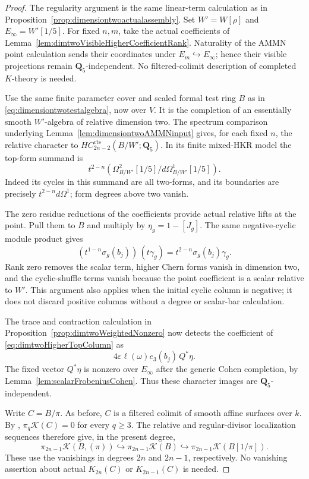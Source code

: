 \documentclass[11pt,a4paper]{article}
\theoremstyle{remark}
\begin{document}
\begin{proof}
The regularity argument is the same linear-term calculation as in
Proposition~\ref{prop:dimensiontwoactualassembly}.
Set $W'=W[\rho]$ and $E_\infty=W'[1/5]$.
For fixed $n,m$, take the actual coefficients of
Lemma~\ref{lem:dimtwoVisibleHigherCoefficientRank}.
Naturality of the AMMN point calculation sends their coordinates
under $E_m\hookrightarrow E_\infty$; hence their visible
projections remain $\mathbf Q_5$-independent.
No filtered-colimit description of completed $K$-theory is needed.

Use the same finite parameter cover and scaled formal test ring
$B$ as in \eqref{eq:dimensiontwotestalgebra}, now over $V$.
It is the completion of an essentially smooth $W'$-algebra
of relative dimension two.  The spectrum comparison underlying
Lemma~\ref{lem:dimensiontwoAMMNinput} gives, for each fixed $n$,
the relative character to $HC_{2n-2}^{\mathrm{cts}}(B/W';\mathbf Q_5)$.
In its finite mixed-HKR model the top-form summand is
\begin{equation}
\label{eq:dimtwoHigherTopColumn}
 t^{2-n}\left(
 \Omega^2_{B/W'}[1/5]/d\Omega^1_{B/W'}[1/5]\right).
\end{equation}
Indeed its cycles in this summand are all two-forms, and its
boundaries are precisely $t^{2-n}d\Omega^1$; form degrees above
two vanish.

The zero residue reductions of the coefficients provide actual
relative lifts at the point.  Pull them to $B$ and multiply by
$\eta_g=1-[J_g]$.  The same negative-cyclic module product gives
\[
 (t^{1-n}\sigma_g(b_j))\,(t\gamma_g)
           =t^{2-n}\sigma_g(b_j)\gamma_g.
\]
Rank zero removes the scalar term, higher Chern forms vanish in
dimension two, and the cyclic-shuffle terms vanish because the
point coefficient is a scalar relative to $W'$.
This argument also applies when the initial cyclic column is
negative; it does not discard positive columns without a degree
or scalar-bar calculation.

The trace and contraction calculation in
Proposition~\ref{prop:dimtwoWeightedNonzero} now detects the
coefficient of \eqref{eq:dimtwoHigherTopColumn} as
\[
 4\varepsilon\ell(\omega)e_3(b_j)\,Q^*\eta.
\]
The fixed vector $Q^*\eta$ is nonzero over $E_\infty$ after the
generic Cohen completion, by
Lemma~\ref{lem:scalarFrobeniusCohen}.
Thus these character images are $\mathbf Q_5$-independent.

Write $C=B/\pi$.  As before, $C$ is a filtered colimit of smooth
affine surfaces over $k$.  By
\cite[Theorem~8.4]{GeisserLevineCharP},
$\pi_q\mathcal K(C)=0$ for every $q\geq3$.
The relative and regular-divisor localization sequences therefore
give, in the present degree,
\[
 \pi_{2n-1}\mathcal K(B,(\pi))
 \hookrightarrow\pi_{2n-1}\mathcal K(B)
 \hookrightarrow\pi_{2n-1}\mathcal K(B[1/\pi]).
\]
These use the vanishings in degrees $2n$ and $2n-1$, respectively.
No vanishing assertion about actual $K_{2n}(C)$ or
$K_{2n-1}(C)$ is needed.


\end{proof}
\end{document}
